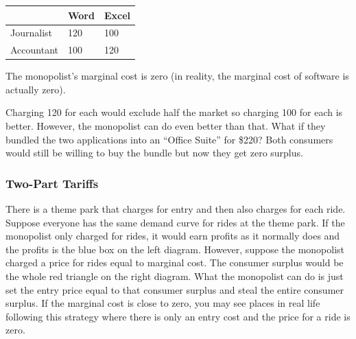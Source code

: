 \documentclass{article}
\begin{document}
\begin{center}
  \begin{tabular}{l|l|l}
    & Word & Excel \\ \hline\hline
    Journalist &  120 & 100 \\ \hline
    Accountant &  100 & 120 \\ \hline\hline
  \end{tabular}
\end{center}
The monopolist's marginal cost is zero (in reality, the marginal cost of software is actually zero).

Charging 120 for each would exclude half the market so charging 100 for each is better. However, the monopolist can do even better than that. What if they bundled the two applications into an ``Office Suite'' for \$220? Both consumers would still be willing to buy the bundle but now they get zero surplus.
\subsubsection*{Two-Part Tariffs}
There is a theme park that charges for entry and then also charges for each ride. Suppose everyone has the same demand curve for rides at the theme park. If the monopolist only charged for rides, it would earn profits as it normally does and the profits is the blue box on the left diagram. However, suppose the monopolist charged a price for rides equal to marginal cost. The consumer surplus would be the whole red triangle on the right diagram. What the monopolist can do is just set the entry price equal to that consumer surplus and steal the entire consumer surplus. If the marginal cost is close to zero, you may see places in real life following this strategy where there is only an entry cost and the price for a ride is zero.

\begin{center}
\end{center}
\end{document}
